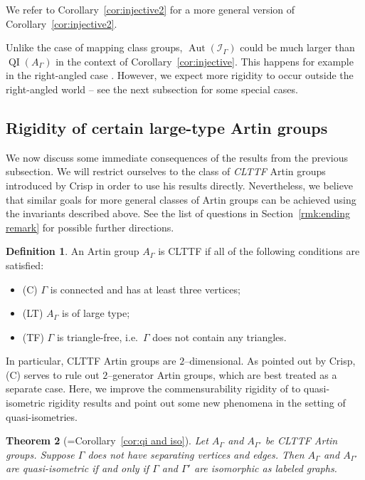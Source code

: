 \documentclass[11pt]{amsart}
\newcommand{\QI}{\operatorname{QI}}
\newcommand{\Aut}{\operatorname{Aut}}
\newcommand {\I}{\mathcal I}
\newtheorem{theorem}{Theorem}[section]
\theoremstyle{definition}
\newtheorem{definition}[theorem]{Definition}
\begin{document}
We refer to Corollary~\ref{cor:injective2} for a more general version of Corollary~\ref{cor:injective2}.

Unlike the case of mapping class groups, $\Aut(\I_\Gamma)$ could be much larger than $\QI(A_\Gamma)$ in the context of Corollary~\ref{cor:injective}. This happens for example in the right-angled case \cite[Corollary 4.20]{MR3692971}. However, we expect more rigidity to occur outside the right-angled world -- see the next subsection for some special cases.



\subsection*{Rigidity of certain large-type Artin groups}
We now discuss some immediate consequences of the results from the previous subsection. We will restrict ourselves to the class of \emph{CLTTF} Artin groups introduced by Crisp \cite{MR2174269} in order to use his results directly. Nevertheless, we believe that similar goals for more general classes of Artin groups can be achieved using the invariants described above. See the list of questions in Section~\ref{rmk:ending remark} for possible further directions.

\begin{definition}
	\label{def:CLTTF}
An Artin group $A_\Gamma$ is CLTTF if all of the following conditions are satisfied:
\begin{itemize}
	\item (C) $\Gamma$ is connected and has at least three vertices;
	\item (LT) $A_\Gamma$ is of large type;
	\item (TF) $\Gamma$ is triangle-free, i.e.\ $\Gamma$ does not contain any triangles.
\end{itemize}
\end{definition}
In particular, CLTTF Artin groups are $2$--dimensional. As pointed out by Crisp, (C) serves to rule out $2$--generator Artin groups, which are best treated as a separate case. Here, we improve the commensurability rigidity of \cite[Theorem 3]{MR2174269} to quasi-isometric rigidity results and point out some new phenomena in the setting of quasi-isometries.

\begin{theorem}[=Corollary~\ref{cor:qi and iso}]
	\label{thm:introduction 3}
Let $A_\Gamma$ and $A_{\Gamma'}$ be CLTTF Artin groups. Suppose $\Gamma$ does not have separating vertices and edges. Then $A_\Gamma$ and $A_{\Gamma'}$ are quasi-isometric if and only if $\Gamma$ and $\Gamma'$ are isomorphic as labeled graphs. 
\end{theorem}
\end{document}
